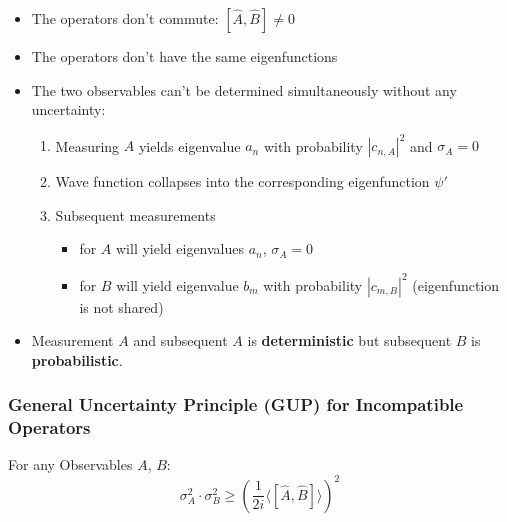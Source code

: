 \begin{itemize}
    \item The operators don't commute: $[\widehat{A}, \widehat{B}] \neq 0$
    \item The operators don't have the same eigenfunctions
    \item The two observables can't be determined simultaneously without any uncertainty:
    \begin{enumerate}
        \item Measuring $A$ yields eigenvalue $a_n$ with probability $|c_{n,A}|^2$ and $\sigma_A=0$
        \item Wave function collapses into the corresponding eigenfunction $\psi'$
        \item Subsequent measurements 
        \begin{itemize}
            \item for $A$ will yield eigenvalues $a_n$, $\sigma_A=0$
            \item for $B$ will yield eigenvalue $b_m$ with probability $|c_{m,B}|^2$ (eigenfunction is not shared)
        \end{itemize}
    \end{enumerate}
    \item Measurement $A$ and subsequent $A$ is \textbf{deterministic} but subsequent $B$ is \textbf{probabilistic}.

\end{itemize}

\subsubsection{General Uncertainty Principle (GUP) for Incompatible Operators}
For any Observables $A$, $B$:
\begin{equation*}
    \sigma_A^2\cdot\sigma_B^2\geqslant{\left(\frac1{2i}\langle[\hat{A},\hat{B}]\rangle\right)}^2
\end{equation*}

